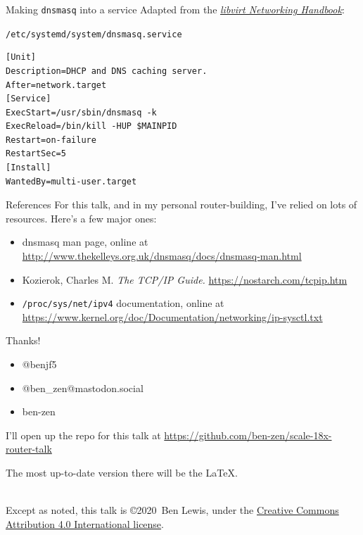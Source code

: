 \documentclass[bigger,aspectratio=169]{beamer}
\begin{document}
\begin{frame}[fragile]{Making \texttt{dnsmasq} into a service}
  Adapted from the \href{https://jamielinux.com/docs/libvirt-networking-handbook/appendix/run-dnsmasq-with-systemd.html}{\textit{libvirt Networking Handbook}}:
  \begin{block}{\texttt{/etc/systemd/system/dnsmasq.service}}
\begin{verbatim}
[Unit]
Description=DHCP and DNS caching server.
After=network.target
[Service]
ExecStart=/usr/sbin/dnsmasq -k
ExecReload=/bin/kill -HUP $MAINPID
Restart=on-failure
RestartSec=5
[Install]
WantedBy=multi-user.target
\end{verbatim}
  \end{block}
\end{frame}

\begin{frame}{References}
  For this talk, and in my personal router-building, I've relied on lots of
  resources. Here's a few major ones:
  \begin{itemize}
  \item dnsmasq man page, online at \url{http://www.thekelleys.org.uk/dnsmasq/docs/dnsmasq-man.html}
  \item Kozierok, Charles M. \textit{The TCP/IP Guide.} \url{https://nostarch.com/tcpip.htm}
  \item \texttt{/proc/sys/net/ipv4} documentation, online at \url{https://www.kernel.org/doc/Documentation/networking/ip-sysctl.txt}
  \end{itemize}
\end{frame}

\begin{frame}{Thanks!}
  \begin{itemize}
  \item[\faTwitter]  @benjf5
  \item[\faMastodon] @ben\_zen@mastodon.social
  \item[\faGithub] ben-zen
  \end{itemize}
  \vspace{2ex}
  I'll open up the repo for this talk at \url{https://github.com/ben-zen/scale-18x-router-talk}

  The most up-to-date version there will be the \LaTeX.
  
  \vspace{1ex}
  \centering
  \LARGE
  \faCreativeCommons\:\faCreativeCommonsBy\\
  \normalsize
  Except as noted, this talk is \copyright 2020~Ben Lewis, under the \href{http://creativecommons.org/licenses/by/4.0/}{Creative Commons Attribution 4.0 International license}.

\end{frame}
\end{document}
